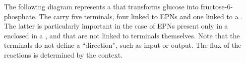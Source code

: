 \begin{center}
\end{center}

The following diagram represents a  that transforms glucose into fructose-6-phosphate. The  carry five terminals, four linked to EPNs and one linked to a . The latter is particularly important in the case of EPNs present only in a  enclosed in a , and that are not linked to terminals themselves. Note that the terminals do not define a ``direction'', such as input or output. The flux of the reactions is determined by the context.

\begin{center}
\end{center}

